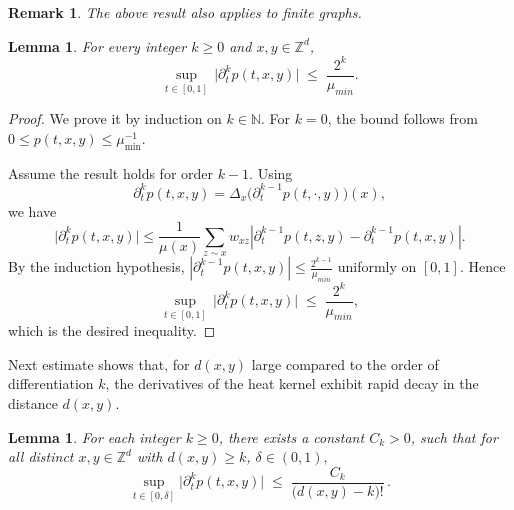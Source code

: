 \documentclass[reqno,12pt]{amsart}
\numberwithin{equation}{section}
\newtheorem{lemma}[theorem]{Lemma}
\newtheorem{remark}[theorem]{Remark}
\begin{document}
\begin{remark}
	The above result also applies to finite graphs.
\end{remark}

\begin{lemma}\label{higher‐derivative-nearest}
	For every integer \(k\ge 0\) and \(x,y\in\mathbb{Z}^d\),
	\[
	\sup_{t\in[0,1]}\,
	\bigl|\partial_t^k p(t,x,y)\bigr|
	\;\le\; \frac{2^k}{\mu_{min}}.
	\]
\end{lemma}

\begin{proof}
	We prove it by induction on \(k\in\mathbb N\).  
	For \(k=0\), the bound follows from \(0 \le p(t,x,y) \le \mu_{\min}^{-1}\).
	
	Assume the result holds for order \(k-1\). Using
	\[
	\partial_t^k p(t,x,y)
	= \Delta_x\bigl(\partial_t^{k-1}p(t,\cdot,y)\bigr)(x),
	\]
	we have
	\[
	\bigl|\partial_t^k p(t,x,y)\bigr|
	\le \frac{1}{\mu(x)}\sum_{z\sim x} w_{xz}
	\left| \partial_t^{k-1}p(t,z,y) - \partial_t^{k-1}p(t,x,y) \right|.
	\]
	By the induction hypothesis, \(|\partial_t^{k-1}p(t,x,y)| \le \frac{2^{k-1}}{\mu_{min}}\) uniformly on \([0,1]\).  
	Hence
	\[
	\sup_{t\in[0,1]}\,
	\bigl|\partial_t^k p(t,x,y)\bigr|
	\;\le\; \frac{2^k}{\mu_{min}},
	\]
	which is the desired inequality.
\end{proof}

Next estimate shows that, for \(d(x,y)\) large compared to the order of differentiation \(k\), the derivatives of the heat kernel exhibit rapid  decay in the distance \(d(x,y)\).


\begin{lemma}\label{rhyjx}
	For each integer \(k\ge0\), there exists a constant \(C_k>0\), such that for all distinct \(x,y\in\mathbb{Z}^d\) with $d(x,y)\ge k$, $\delta\in (0,1),$
	\[
	\sup_{t\in[0,\delta]} \bigl|\partial_t^k p(t,x,y)\bigr|
	\;\le\;\frac{C_k}{\bigl(d(x,y)-k\bigr)!}\,.
	\]
\end{lemma}
\end{document}
